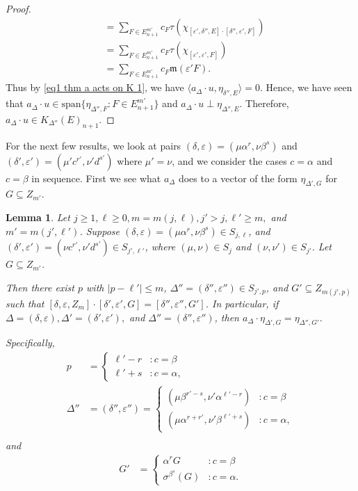 \documentclass[12pt]{amsart}
\newcommand{\sse}{\subseteq}
\newcommand{\spn}{\text{span}}
\newcommand{\mf}[1]{\mathfrak{#1}}
\newcommand{\al}{\alpha}
\newcommand{\be}{\beta}
\newcommand{\de}{\delta}
\newcommand{\De}{\Delta}
\newcommand{\ep}{\varepsilon}
\newcommand{\si}{\sigma}
\theoremstyle{plain} %
\newtheorem{Lemma}[Theorem]{Lemma}
\theoremstyle{definition} %
\begin{document}
\begin{proof}
\begin{align*}
    &= \sum_{F \in E^{m'}_{n+1}} c_F \tau(\chi_{[\ep', \de'', E]\cdot [\de'', \ep', F]})\\
    &= \sum_{F \in E^{m'}_{n+1}} c_F \tau(\chi_{[\ep', \ep', F]})\\
    &= \sum_{F \in E^{m'}_{n+1}} c_F \mf{m}(\ep' F).
\end{align*}
Thus by \eqref{eq1 thm a acts on K 1}, we have $\langle a_{\De}\cdot u, \eta_{\de'',E} \rangle = 0$. Hence, we have seen that $a_{\De}\cdot u \in \spn\{\eta_{\De'',F} : F \in E_{n+1}^{m'}\}$ and $a_{\De}\cdot u \perp \eta_{\De'', E}$. Therefore, $a_{\De}\cdot u \in K_{\De''}(E)_{n+1}$.
\end{proof}



For the next few results, we look at pairs $(\de,\ep) = (\mu \al^r, \nu \be^s)$ and $(\de',\ep') = (\mu' c^{r'}, \nu' d^{s'})$ where $\mu' = \nu$, and we consider the cases $c=\al$ and $c=\be$ in sequence. First we see what $a_{\De}$ does to a vector of the form $\eta_{\De', G}$ for $G \sse Z_{m'}$.




\begin{Lemma}\label{lem a acts on vector 2}
    Let $j \geq 1, \ell \geq 0, m = m(j,\ell), j' > j, \ell' \ge m,$ and $m' = m(j', \ell')$.
    Suppose $(\de, \ep) = (\mu\al^r, \nu\be^s) \in S_{j,\ell}$,
    and $(\de', \ep') = (\nu c^{r'}, \nu'd^{s'}) \in S_{j', \ell'}$, where $(\mu,\nu) \in S_j$ and $(\nu,\nu') \in S_{j'}$. Let $G \sse Z_{m'}$.

    Then there exist $p$ with $|p - \ell'| \leq m$, $\De'' = (\de'', \ep'') \in S_{j',p}$, and $G' \sse Z_{m(j',p)}$ such that $[\de, \ep, Z_m] \cdot [\de', \ep', G] = [\de'', \ep'', G']$.
    In particular, if $\De = (\de, \ep), \De' = (\de', \ep'),$ and $\De'' = (\de'', \ep'')$, then $a_{\De} \cdot \eta_{\De', G} = \eta_{\De'',G'}.$

    Specifically, 
    \begin{align*}
        p &= \begin{cases}
            \ell' - r &: c = \be\\
            \ell' + s &: c = \al,
        \end{cases}\\
        \De'' &= (\de'', \ep'') = \begin{cases}
            (\mu \be^{r'-s}, \nu' \al^{\ell'-r} ) &: c = \be\\
            (\mu \al^{r+r'}, \nu' \be^{\ell' + s} ) &: c = \al,
        \end{cases}\\
    \end{align*}
    and
    \begin{align*}
        G' &= \begin{cases}
            \al^r G &: c = \be\\
            \si^{\be^s}(G) &: c = \al.
        \end{cases}\\
    \end{align*}
\end{Lemma}
\end{document}
